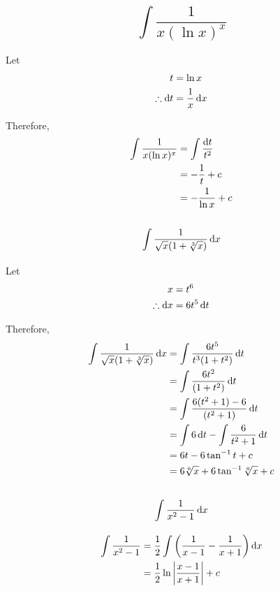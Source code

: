 \documentclass[fleqn, a4paper]{article}
\begin{document}
\subsection{\[\int \dfrac{1}{x (\ln x)^x}\]}

Let
\begin{align*}
	t &= \ln x\\
	\therefore \dif t &= \dfrac{1}{x} \dif x
\end{align*}

Therefore,
\begin{align*}
	\int \dfrac{1}{x (\ln x)^x} &= \int \dfrac{\dif t}{t^2}\\
	&= -\dfrac{1}{t} + c\\
	&= -\dfrac{1}{\ln x} + c
\end{align*}

\subsection{\[\int \dfrac{1}{\sqrt{x}(1 + \sqrt[3]{x})} \dif x\]}

Let
\begin{align*}
	x &= t^6\\
	\therefore \dif x &= 6t^5 \dif t
\end{align*}

Therefore,
\begin{align*}
	\int \dfrac{1}{\sqrt{x}(1 + \sqrt[3]{x})} \dif x &= \int \dfrac{6t^5}{t^3(1 + t^2)} \dif t\\
	&= \int \dfrac{6t^2}{(1 + t^2)} \dif t\\
	&= \int \dfrac{6(t^2 + 1) - 6}{(t^2 + 1)} \dif t\\
	&= \int 6 \dif t - \int \dfrac{6}{t^2 + 1} \dif t\\
	&= 6t - 6 \tan^{-1} t + c\\
	&= 6\sqrt[6]{x} + 6 \tan^{-1} \sqrt[6]{x} + c
\end{align*}

\subsection{\[\int \dfrac{1}{x^2 - 1} \dif x\]}

\begin{align*}
	\int \dfrac{1}{x^2 - 1} &= \dfrac{1}{2} \int \left( \dfrac{1}{x - 1} - \dfrac{1}{x + 1} \right) \dif x\\
	&= \dfrac{1}{2} \ln \left\lvert \dfrac{x - 1}{x + 1} \right\rvert + c
\end{align*}
\end{document}

